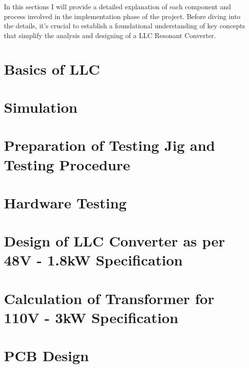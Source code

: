 In this sections I will provide a detailed explanation of each component and
process involved in the implementation phase of the project. Before diving into
the details, it's crucial to establish a foundational understanding of key
concepts that simplify the analysis and designing of a LLC Resonant Converter.

\section{Basics of LLC}

\section{Simulation}

\section{Preparation of Testing Jig and Testing Procedure}

\section{Hardware Testing}

\section{Design of LLC Converter as per 48V - 1.8kW Specification}

\section{Calculation of Transformer for 110V - 3kW Specification}

\section{PCB Design}
